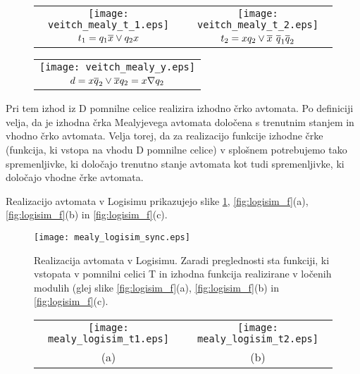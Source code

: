 \begin{resitev}
\begin{enumerate}
\begin{figure}[!ht]
\begin{center}
\begin{tabular}{cc}
\texttt{[image: veitch\_mealy\_t\_1.eps]} &
\texttt{[image: veitch\_mealy\_t\_2.eps]} \\
$t_1 = q_1 \overline x \vee q_2 x$ & $t_2 = x q_2 \vee \overline x_{\ } \overline q_1 \overline q_2$\\
\end{tabular}
\end{center}
\end{figure}

\begin{figure}[!ht]
\begin{center}
\begin{tabular}{c}
\texttt{[image: veitch\_mealy\_y.eps]} \\
$d = x \overline q_2 \vee \overline x q_2 = x \nabla q_2$\\
\end{tabular}
\end{center}
\end{figure}

Pri tem izhod iz D pomnilne celice realizira izhodno črko avtomata. Po definiciji velja, da je izhodna črka Mealyjevega avtomata določena s trenutnim stanjem in vhodno črko avtomata. Velja torej, da za realizacijo funkcije izhodne črke (funkcija, ki vstopa na vhodu D pomnilne celice) v splošnem potrebujemo tako spremenljivke, ki določajo trenutno stanje avtomata kot tudi spremenljivke, ki določajo vhodne črke avtomata.

\end{enumerate}

\bigskip

Realizacijo avtomata v Logisimu prikazujejo slike \ref{fig:logisim}, \ref{fig:logisim_f}(a), \ref{fig:logisim_f}(b) in \ref{fig:logisim_f}(c).

\begin{figure}[ht]
\begin{center}
\texttt{[image: mealy\_logisim\_sync.eps]}
\end{center}
\caption{Realizacija avtomata v Logisimu. Zaradi preglednosti sta funkciji, ki vstopata v pomnilni celici T in izhodna funkcija realizirane v ločenih modulih (glej slike \ref{fig:logisim_f}(a), \ref{fig:logisim_f}(b) in \ref{fig:logisim_f}(c).}
\label{fig:logisim}
\end{figure}

\begin{figure}[!ht]
\begin{center}
\begin{tabular}{cc}
\texttt{[image: mealy\_logisim\_t1.eps]} &
\texttt{[image: mealy\_logisim\_t2.eps]} \\
(a) & (b) \\
\end{tabular}


\end{center}
\end{figure}
\end{resitev}

